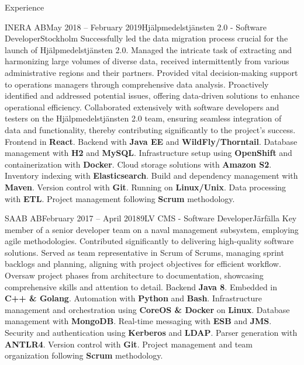 \documentclass{resume}
\begin{document}
\begin{rSection}{Experience}
    \begin{rSubsection}{INERA AB}{May 2018 -- February 2019}{Hjälpmedelstjänsten 2.0 - Software Developer}{Stockholm}
      \bItem Successfully led the data migration process crucial for the launch of Hjälpmedelstjänsten 2.0. Managed the intricate task of extracting and harmonizing large volumes of diverse data, received intermittently from various administrative regions and their partners.
      \bItem Provided vital decision-making support to operations managers through comprehensive data analysis.
      \bItem Proactively identified and addressed potential issues, offering data-driven solutions to enhance operational efficiency.
      \bItem Collaborated extensively with software developers and testers on the Hjälpmedelstjänsten 2.0 team, ensuring seamless integration of data and functionality, thereby contributing significantly to the project's success.
      \techItem Frontend in \textbf{React}. Backend with \textbf{Java EE} and \textbf{WildFly/Thorntail}. Database management with \textbf{H2} and \textbf{MySQL}. Infrastructure setup using \textbf{OpenShift} and containerization with \textbf{Docker}. Cloud storage solutions with \textbf{Amazon S2}. Inventory indexing with \textbf{Elasticsearch}. Build and dependency management with \textbf{Maven}. Version control with \textbf{Git}. Running on \textbf{Linux/Unix}. Data processing with \textbf{ETL}. Project management following \textbf{Scrum} methodology.
    \end{rSubsection}

    \begin{rSubsection}{SAAB AB}{February 2017 -- April 2018}{9LV CMS - Software Developer}{Järfälla}
      \bItem Key member of a senior developer team on a naval management subsystem, employing agile methodologies. Contributed significantly to delivering high-quality software solutions. Served as team representative in Scrum of Scrums, managing sprint backlogs and planning, aligning with project objectives for efficient workflow. Oversaw project phases from architecture to documentation, showcasing comprehensive skills and attention to detail.
      \techItem Backend \textbf{Java 8}. Embedded in \textbf{C++ \& Golang}. Automation with \textbf{Python} and \textbf{Bash}. Infrastructure management and orchestration using \textbf{CoreOS \& Docker} on \textbf{Linux}. Database management with \textbf{MongoDB}. Real-time messaging with \textbf{ESB} and \textbf{JMS}. Security and authentication using \textbf{Kerberos} and \textbf{LDAP}. Parser generation with \textbf{ANTLR4}. Version control with \textbf{Git}. Project management and team organization following \textbf{Scrum} methodology.
    \end{rSubsection}


\end{rSection}
\end{document}
